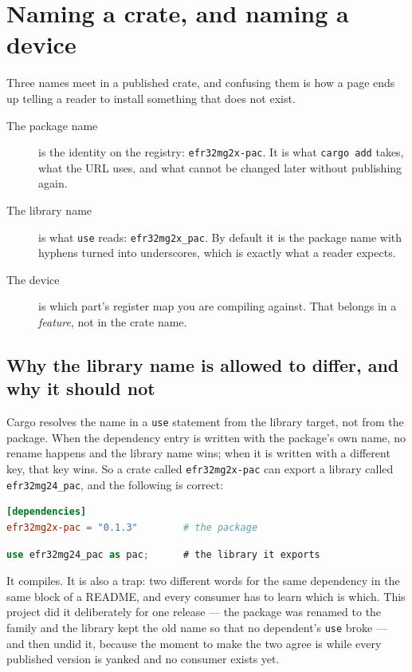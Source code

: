 \section{Naming a crate, and naming a device}
\label{sec:naming-and-device-selection}

Three names meet in a published crate, and confusing them is how a page ends up telling a reader to install something
that does not exist.

\begin{description}
  \item[The package name] is the identity on the registry: \texttt{efr32mg2x-pac}. It is what
        \texttt{cargo add} takes, what the URL uses, and what cannot be changed later without publishing again.
  \item[The library name] is what \texttt{use} reads: \texttt{efr32mg2x\_pac}. By default it is the package name with
        hyphens turned into underscores, which is exactly what a reader expects.
  \item[The device] is which part's register map you are compiling against. That belongs in a \emph{feature}, not in
        the crate name.
\end{description}

\subsection{Why the library name is allowed to differ, and why it should not}

Cargo resolves the name in a \texttt{use} statement from the library target, not from the package. When the dependency
entry is written with the package's own name, no rename happens and the library name wins; when it is written with a
different key, that key wins. So a crate called \texttt{efr32mg2x-pac} can export a library called
\texttt{efr32mg24\_pac}, and the following is correct:

\begin{lstlisting}[language=toml]
[dependencies]
efr32mg2x-pac = "0.1.3"        # the package
\end{lstlisting}

\begin{lstlisting}[language=Rust]
use efr32mg24_pac as pac;      # the library it exports
\end{lstlisting}

It compiles. It is also a trap: two different words for the same dependency in the same block of a README, and every
consumer has to learn which is which. This project did it deliberately for one release --- the package was renamed to
the family and the library kept the old name so that no dependent's \texttt{use} broke --- and then undid it, because the
moment to make the two agree is while every published version is yanked and no consumer exists yet.

